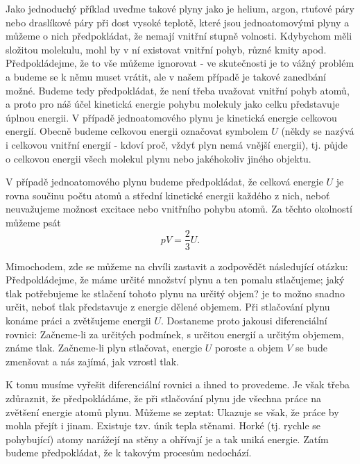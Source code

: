     Jako jednoduchý příklad uveďme takové plyny jako je helium, argon, rtuťové páry nebo draslíkové
    páry při dost vysoké teplotě, které jsou jednoatomovými plyny a můžeme o nich předpokládat, že
    nemají vnitřní stupně volnosti. Kdybychom měli složitou molekulu, mohl by v ní existovat vnitřní
    pohyb, různé kmity apod. Předpokládejme, že to vše můžeme ignorovat - ve skutečnosti je to vážný
    problém a budeme se k němu muset vrátit, ale v našem případě je takové zanedbání možné. Budeme
    tedy předpokládat, že není třeba uvažovat vnitřní pohyb atomů, a proto pro náš účel kinetická
    energie pohybu molekuly jako celku představuje úplnou energii. V případě jednoatomového plynu je
    kinetická energie celkovou energií. Obecně budeme celkovou energii označovat symbolem \(U\)
    (někdy se nazývá i celkovou vnitřní energií - kdoví proč, vždyť plyn nemá vnější energii), tj.
    půjde o celkovou energii všech molekul plynu nebo jakéhokoliv jiného objektu.

    V případě jednoatomového plynu budeme předpokládat, že celková energie \(U\) je rovna součinu
    počtu atomů a střední kinetické energii každého z nich, neboť neuvažujeme možnost excitace nebo
    vnitřního pohybu atomů. Za těchto okolností můžeme psát
    \begin{equation}\label{fyz:eq621}
      pV = \frac{2}{3}U.
    \end{equation}

    Mimochodem, zde se můžeme na chvíli zastavit a zodpovědět následující otázku: Předpokládejme, že
    máme určité množství plynu a ten pomalu stlačujeme; jaký tlak potřebujeme ke stlačení tohoto
    plynu na určitý objem? je to možno snadno určit, neboť tlak představuje  z energie
    dělené objemem. Při stlačování plynu konáme práci a zvětšujeme energii \(U\). Dostaneme proto
    jakousi diferenciální rovnici: Začneme-li za určitých podmínek, s určitou energií a určitým
    objemem, známe tlak. Začneme-li plyn stlačovat, energie \(U\) poroste a objem \(V\) se bude
    zmenšovat a nás zajímá, jak vzrostl tlak.

    K tomu musíme vyřešit diferenciální rovnici a ihned to provedeme. Je však třeba zdůraznit, že
    předpokládáme, že při stlačování plynu jde všechna práce na zvětšení energie atomů plynu. Můžeme
    se zeptat:  Ukazuje se
    však, že práce by mohla přejít i jinam. Existuje tzv. únik tepla stěnami. Horké (tj. rychle se
    pohybující) atomy narážejí na stěny a ohřívají je a tak uniká energie. Zatím budeme
    předpokládat, že k takovým procesům nedochází.

